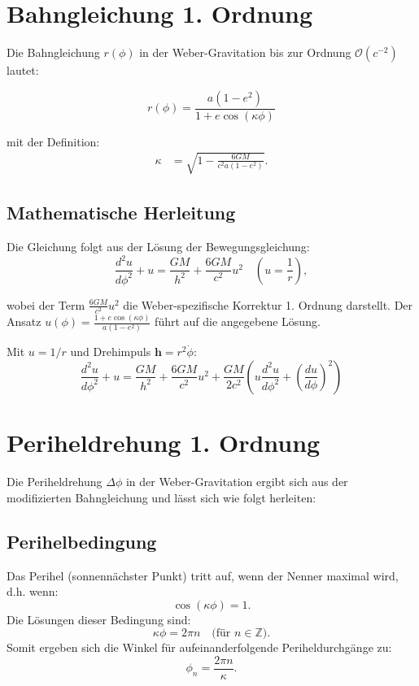 \newpage
\section{Bahngleichung 1. Ordnung}
Die Bahngleichung \(r(\phi)\) in der Weber-Gravitation bis zur Ordnung \(\mathcal{O}(c^{-2})\) lautet:

\begin{equation}
r(\phi) = \frac{a(1 - e^2)}{1 + e \cos\left(\kappa\phi\right)}
\end{equation}

\noindent mit der Definition:
\begin{align*}
\kappa &= \sqrt{1 - \frac{6GM}{c^2a(1 - e^2)}}.
\end{align*}

\subsection*{Mathematische Herleitung}
Die Gleichung folgt aus der Lösung der Bewegungsgleichung:
\begin{equation}
\frac{d^2u}{d\phi^2} + u = \frac{GM}{h^2} + \frac{6GM}{c^2} u^2 \quad \left(u = \frac{1}{r}\right),
\end{equation}

wobei der Term \(\frac{6GM}{c^2} u^2\) die Weber-spezifische Korrektur 1. Ordnung darstellt. Der Ansatz \(u(\phi) = \frac{1 + e \cos(\kappa\phi)}{a(1 - e^2)}\) führt auf die angegebene Lösung.

Mit $u=1/r$ und Drehimpuls $\mathbf{h}=r^2\dot{\phi}$:
\begin{equation}
\frac{d^2u}{d\phi^2} + u = \frac{GM}{h^2} + \frac{6GM}{c^2}u^2 + \frac{GM}{2c^2}\left(u\frac{d^2u}{d\phi^2} + \left(\frac{du}{d\phi}\right)^2\right)
\end{equation}

\section{Periheldrehung 1. Ordnung}
Die Periheldrehung $\Delta\phi$ in der Weber-Gravitation ergibt sich aus der modifizierten Bahngleichung und lässt sich wie folgt herleiten:

\subsection{Perihelbedingung}
Das Perihel (sonnennächster Punkt) tritt auf, wenn der Nenner maximal wird, d.h. wenn:
\begin{equation}
\cos(\kappa\phi) = 1.
\end{equation}
Die Lösungen dieser Bedingung sind:
\begin{equation}
\kappa\phi = 2\pi n \quad \text{(für $n \in \mathbb{Z}$)}.
\end{equation}
Somit ergeben sich die Winkel für aufeinanderfolgende Periheldurchgänge zu:
\begin{equation}
\phi_n = \frac{2\pi n}{\kappa}.
\end{equation}


